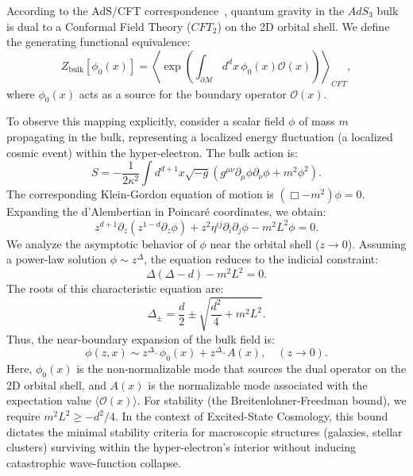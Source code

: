 According to the AdS/CFT correspondence~\cite{Maldacena1997}, quantum gravity in the $AdS_3$ bulk is dual to a Conformal Field Theory ($CFT_2$) on the 2D orbital shell. We define the generating functional equivalence:
\begin{equation}
    Z_{\text{bulk}}[\phi_0(x)] = \left\langle \exp\left( \int_{\partial \mathcal{M}} d^d x \, \phi_0(x) \mathcal{O}(x) \right) \right\rangle_{CFT},
\end{equation}
where $\phi_0(x)$ acts as a source for the boundary operator $\mathcal{O}(x)$.

To observe this mapping explicitly, consider a scalar field $\phi$ of mass $m$ propagating in the bulk, representing a localized energy fluctuation (a localized cosmic event) within the hyper-electron. The bulk action is:
\begin{equation}
    S = -\frac{1}{2\kappa^2} \int d^{d+1}x \sqrt{-g} \left( g^{\mu\nu} \partial_\mu \phi \partial_\nu \phi + m^2 \phi^2 \right).
\end{equation}
The corresponding Klein-Gordon equation of motion is $\left( \Box - m^2 \right) \phi = 0$. Expanding the d'Alembertian in Poincaré coordinates, we obtain:
\begin{equation}
    z^{d+1} \partial_z \left( z^{1-d} \partial_z \phi \right) + z^2 \eta^{ij} \partial_i \partial_j \phi - m^2 L^2 \phi = 0.
\end{equation}
We analyze the asymptotic behavior of $\phi$ near the orbital shell ($z \to 0$). Assuming a power-law solution $\phi \sim z^\Delta$, the equation reduces to the indicial constraint:
\begin{equation}
    \Delta(\Delta - d) - m^2 L^2 = 0.
\end{equation}
The roots of this characteristic equation are:
\begin{equation}
    \Delta_\pm = \frac{d}{2} \pm \sqrt{\frac{d^2}{4} + m^2 L^2}.
\end{equation}
Thus, the near-boundary expansion of the bulk field is:
\begin{equation}
    \phi(z, x) \sim z^{\Delta_-} \phi_0(x) + z^{\Delta_+} A(x), \quad (z \to 0).
\end{equation}
Here, $\phi_0(x)$ is the non-normalizable mode that sources the dual operator on the 2D orbital shell, and $A(x)$ is the normalizable mode associated with the expectation value $\langle \mathcal{O}(x) \rangle$. For stability (the Breitenlohner-Freedman bound), we require $m^2 L^2 \geq -d^2/4$. In the context of Excited-State Cosmology, this bound dictates the minimal stability criteria for macroscopic structures (galaxies, stellar clusters) surviving within the hyper-electron's interior without inducing catastrophic wave-function collapse.

